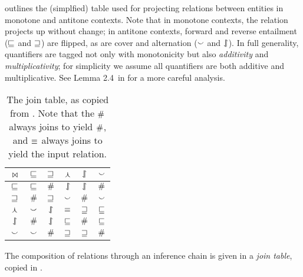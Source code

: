  outlines the (simplfied) table used for projecting
  relations between entities in monotone and antitone contexts.
Note that in monotone contexts, the relation projects up without
  change;
  in antitone contexts, forward and reverse entailment
  ($\sqsubseteq$ and $\sqsupseteq$) are flipped, as are cover and
  alternation ($\smallsmile$ and $\downharpoonleft\hspace{-0.30em}\upharpoonright$).
In full generality, quantifiers are tagged not only with monotonicity
  but also \textit{additivity} and \textit{multiplicativity};
  for simplicity we assume all quantifiers are both additive and
  multiplicative.
See Lemma 2.4\ in  for a more careful
  analysis.

\begin{table}
	\begin{center}
	\begin{tabular}{|c||c|c|c|c|c|}
    \hline
    $\bowtie$ & $\sqsubseteq$ & $\sqsupseteq$ & $\curlywedge$ & $\downharpoonleft\hspace{-0.30em}\upharpoonright$ & $\smallsmile$ \\
    \hline
    $\sqsubseteq$ & $\sqsubseteq$ & $\#$ & $\downharpoonleft\hspace{-0.30em}\upharpoonright$ & $\downharpoonleft\hspace{-0.30em}\upharpoonright$ & $\#$ \\
    $\sqsupseteq$ & $\#$ & $\sqsupseteq$ & $\smallsmile$ & $\#$ & $\smallsmile$ \\
    $\curlywedge$ & $\smallsmile$ & $\downharpoonleft\hspace{-0.30em}\upharpoonright$ & $\equiv$ & $\sqsupseteq$ & $\sqsubseteq$ \\
    $\downharpoonleft\hspace{-0.30em}\upharpoonright$ & $\#$ & $\downharpoonleft\hspace{-0.30em}\upharpoonright$ & $\sqsubseteq$ & $\#$ & $\sqsubseteq$ \\
    $\smallsmile$ & $\smallsmile$ & $\#$ & $\sqsupseteq$ & $\sqsupseteq$ & $\#$ \\
    \hline
	\end{tabular}
	\caption{
    The join table, as copied from .
    Note that the $\#$ always joins to yield $\#$,
    and $\equiv$ always joins to yield the input relation.
		\label{tab:join}
	}
	\end{center}
\end{table}

The composition of relations through an inference chain is given in
  a \textit{join table}, copied in .

